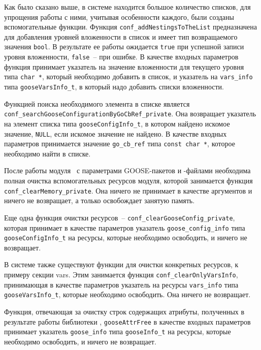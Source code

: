 
Как было сказано выше, в системе находится большое количество списков, для упрощения работы с ними, учитывая особенности каждого, были созданы вспомогательные функции.
Функция \lstinline{conf_addNestingsToTheList} предназначена для добавления уровней вложенности в список и имеет тип возвращаемого значения \lstinline{bool}. В результате ее работы ожидается \lstinline{true}
при успешной записи уровня вложенности, \lstinline{false}~-- при ошибке. В качестве входных параметров функция принимает указатель на значение вложенности для текущего уровня
типа \lstinline{char *}, который необходимо добавить в список, и указатель на \lstinline{vars_info} типа \lstinline{gooseVarsInfo_t}, в который надо
добавить списки вложенности.

Функцией поиска необходимого элемента в списке является \lstinline{conf_searchGooseConfigurationByGoCbRef_private}. Она возвращает указатель на элемент списка типа \lstinline{gooseConfigInfo_t}, в котором найдено искомое значение, \lstinline{NULL}, если искомое значение не найдено. В качестве входных параметров принимается значение \lstinline{go_cb_ref} типа
\lstinline{const char *}, которое необходимо найти в списке.

После работы модуля \moduleCfg\ с параметрами GOOSE-пакетов и \cid-файлами необходима полная очистка вспомогательных ресурсов модуля, которой занимается функция
\lstinline{conf_clearMemory_private}. Она ничего не принимает в качестве аргументов и ничего не возвращает, а только освобождает занятую память.

Еще одна функция очистки ресурсов~-- \lstinline{conf_clearGooseConfig_private}, которая принимает в качестве параметров указатель \lstinline{goose_config_info} типа
\lstinline{gooseConfigInfo_t} на ресурсы, которые необходимо освободить, и ничего не возвращает.

В системе также существуют функции для очистки конкретных ресурсов, к примеру секции vars. Этим занимается функция \lstinline{conf_clearOnlyVarsInfo},
принимающая в качестве параметров указатель на ресурсы \lstinline{vars_info} типа \lstinline{gooseVarsInfo_t}, которые необходимо освободить. Она ничего не возвращает.

Функция, отвечающая за очистку строк содержащих атрибуты, полученных в результате работы библиотеки \libXml, \lstinline{gooseAttrFree} в качестве входных
параметров принимает указатель \lstinline{goose_info} типа \lstinline{gooseInfo_t} на ресурсы, которые необходимо освободить, и ничего не возвращает.


